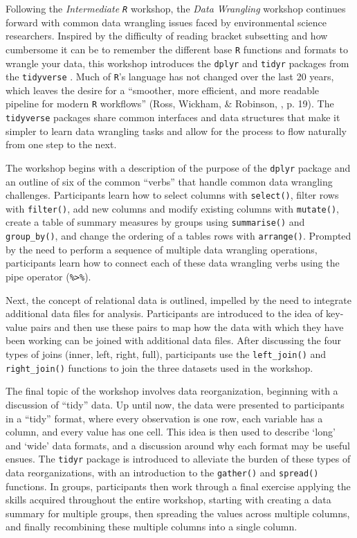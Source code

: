 \documentclass[12pt]{article}
\begin{document}
\quad Following the \emph{Intermediate \texttt{R}} workshop, the \emph{Data Wrangling} workshop continues forward with common data wrangling issues faced by environmental science researchers. Inspired by the difficulty of reading bracket subsetting and how cumbersome it can be to remember the different base \texttt{R} functions and formats to wrangle your data, this workshop introduces the \texttt{dplyr} \citep{dpylr} and \texttt{tidyr} \citep{tidyr} packages from the \texttt{tidyverse} \citep{tidyverse}. Much of \texttt{R}'s language has not changed over the last 20 years, which leaves the desire for a ``smoother, more efficient, and more readable pipeline for modern \texttt{R} workflows'' (Ross, Wickham, \& Robinson, \citeyear{tidytools}, p. 19). The \texttt{tidyverse} packages share common interfaces and data structures that make it simpler to learn data wrangling tasks and allow for the process to flow naturally from one step to the next. 

\quad The workshop begins with a description of the purpose of the \texttt{dplyr} package and an outline of six of the common ``verbs'' that handle common data wrangling challenges. Participants learn how to select columns with \texttt{select()}, filter rows with \texttt{filter()}, add new columns and modify existing columns with \texttt{mutate()}, create a table of summary measures by groups using \texttt{summarise()} and \texttt{group\_by()}, and change the ordering of a tables rows with \texttt{arrange()}. Prompted by the need to perform a sequence of multiple data wrangling operations, participants learn how to connect each of these data wrangling verbs using the pipe operator (\texttt{\%>\%}). 

\quad Next, the concept of relational data is outlined, impelled by the need to integrate additional data files for analysis. Participants are introduced to the idea of key-value pairs and then use these pairs to map how the data with which they have been working can be joined with additional data files. After discussing the four types of joins (inner, left, right, full), participants use the \texttt{left\_join()} and  \texttt{right\_join()} functions to join the three datasets used in the workshop. 

\quad The final topic of the workshop involves data reorganization, beginning with a discussion of ``tidy'' data. Up until now, the data were presented to participants in a ``tidy'' format, where every observation is one row, each variable has a column, and every value has one cell. This idea is then used to describe `long' and `wide' data formats, and a discussion around why each format may be useful ensues. The \texttt{tidyr} package is introduced to alleviate the burden of these types of data reorganizations, with an introduction to the \texttt{gather()} and \texttt{spread()} functions. In groups, participants then work through a final exercise applying the skills acquired throughout the entire workshop, starting with creating a data summary for multiple groups, then spreading the values across multiple columns, and finally recombining these multiple columns into a single column. 
\end{document}
